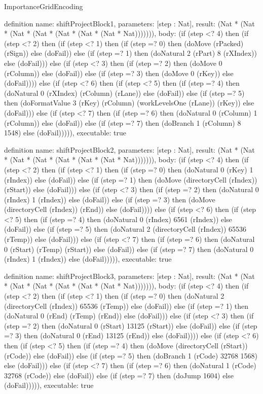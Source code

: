 \begin{lexlean}{ImportanceGridEncoding}
\begin{semanticmodule}
definition{
  name: shiftProjectBlock1,
  parameters: [step : Nat],
  result: (Nat * (Nat * (Nat * (Nat * (Nat * (Nat * (Nat * Nat))))))),
  body: (if (step <? 4) then
      (if (step <? 2) then
      (if (step <? 1) then
      (if (step =? 0) then (doMove (rPacked) (rSign)) else (doFail)) else
      (if (step =? 1) then (doNatural 2 (rPart) 8 (rXIndex)) else (doFail))) else
      (if (step <? 3) then
      (if (step =? 2) then (doMove 0 (rColumn)) else (doFail)) else
      (if (step =? 3) then (doMove 0 (rKey)) else (doFail)))) else
      (if (step <? 6) then
      (if (step <? 5) then
      (if (step =? 4) then (doNatural 0 (rXIndex) (rColumn) (rLane)) else (doFail)) else
      (if (step =? 5) then (doFormatValue 3 (rKey) (rColumn) (workLevelsOne (rLane)) (rKey)) else (doFail))) else
      (if (step <? 7) then
      (if (step =? 6) then (doNatural 0 (rColumn) 1 (rColumn)) else (doFail)) else
      (if (step =? 7) then (doBranch 1 (rColumn) 8 1548) else (doFail))))),
  executable: true
}

definition{
  name: shiftProjectBlock2,
  parameters: [step : Nat],
  result: (Nat * (Nat * (Nat * (Nat * (Nat * (Nat * (Nat * Nat))))))),
  body: (if (step <? 4) then
      (if (step <? 2) then
      (if (step <? 1) then
      (if (step =? 0) then (doNatural 0 (rKey) 1 (rIndex)) else (doFail)) else
      (if (step =? 1) then (doMove (directoryCell (rIndex)) (rStart)) else (doFail))) else
      (if (step <? 3) then
      (if (step =? 2) then (doNatural 0 (rIndex) 1 (rIndex)) else (doFail)) else
      (if (step =? 3) then (doMove (directoryCell (rIndex)) (rEnd)) else (doFail)))) else
      (if (step <? 6) then
      (if (step <? 5) then
      (if (step =? 4) then (doNatural 0 (rIndex) 6561 (rIndex)) else (doFail)) else
      (if (step =? 5) then (doNatural 2 (directoryCell (rIndex)) 65536 (rTemp)) else (doFail))) else
      (if (step <? 7) then
      (if (step =? 6) then (doNatural 0 (rStart) (rTemp) (rStart)) else (doFail)) else
      (if (step =? 7) then (doNatural 0 (rIndex) 1 (rIndex)) else (doFail))))),
  executable: true
}

definition{
  name: shiftProjectBlock3,
  parameters: [step : Nat],
  result: (Nat * (Nat * (Nat * (Nat * (Nat * (Nat * (Nat * Nat))))))),
  body: (if (step <? 4) then
      (if (step <? 2) then
      (if (step <? 1) then
      (if (step =? 0) then (doNatural 2 (directoryCell (rIndex)) 65536 (rTemp)) else (doFail)) else
      (if (step =? 1) then (doNatural 0 (rEnd) (rTemp) (rEnd)) else (doFail))) else
      (if (step <? 3) then
      (if (step =? 2) then (doNatural 0 (rStart) 13125 (rStart)) else (doFail)) else
      (if (step =? 3) then (doNatural 0 (rEnd) 13125 (rEnd)) else (doFail)))) else
      (if (step <? 6) then
      (if (step <? 5) then
      (if (step =? 4) then (doMove (directoryCell (rStart)) (rCode)) else (doFail)) else
      (if (step =? 5) then (doBranch 1 (rCode) 32768 1568) else (doFail))) else
      (if (step <? 7) then
      (if (step =? 6) then (doNatural 1 (rCode) 32768 (rCode)) else (doFail)) else
      (if (step =? 7) then (doJump 1604) else (doFail))))),
  executable: true
}


\end{semanticmodule}
\end{lexlean}
